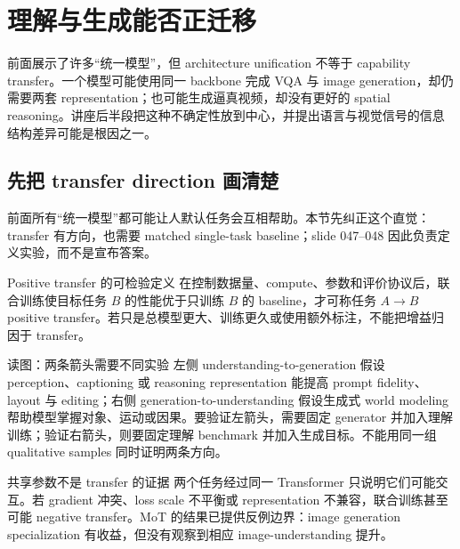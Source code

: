 \section{理解与生成能否正迁移}

前面展示了许多“统一模型”，但 architecture unification 不等于 capability transfer。一个模型可能使用同一 backbone 完成 VQA 与 image generation，却仍需要两套 representation；也可能生成逼真视频，却没有更好的 spatial reasoning。讲座后半段把这种不确定性放到中心，并提出语言与视觉信号的信息结构差异可能是根因之一。

\subsection{先把 transfer direction 画清楚}

前面所有“统一模型”都可能让人默认任务会互相帮助。本节先纠正这个直觉：transfer 有方向，也需要 matched single-task baseline；slide 047--048 因此负责定义实验，而不是宣布答案。


\begin{importantbox}{Positive transfer 的可检验定义}
在控制数据量、compute、参数和评价协议后，联合训练使目标任务 $B$ 的性能优于只训练 $B$ 的 baseline，才可称任务 $A\rightarrow B$ positive transfer。若只是总模型更大、训练更久或使用额外标注，不能把增益归因于 transfer。
\end{importantbox}


\begin{knowledgebox}{读图：两条箭头需要不同实验}
左侧 understanding-to-generation 假设 perception、captioning 或 reasoning representation 能提高 prompt fidelity、layout 与 editing；右侧 generation-to-understanding 假设生成式 world modeling 帮助模型掌握对象、运动或因果。要验证左箭头，需要固定 generator 并加入理解训练；验证右箭头，则要固定理解 benchmark 并加入生成目标。不能用同一组 qualitative samples 同时证明两条方向。
\end{knowledgebox}

\begin{warningbox}{共享参数不是 transfer 的证据}
两个任务经过同一 Transformer 只说明它们可能交互。若 gradient 冲突、loss scale 不平衡或 representation 不兼容，联合训练甚至可能 negative transfer。MoT 的结果已提供反例边界：image generation specialization 有收益，但没有观察到相应 image-understanding 提升。
\end{warningbox}


